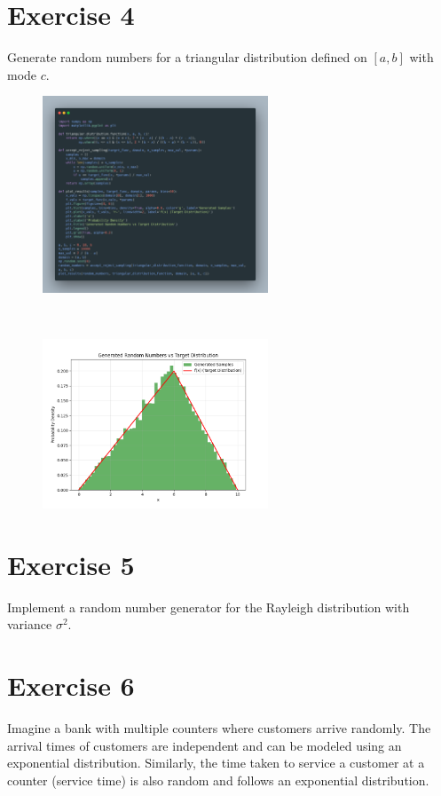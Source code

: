 \documentclass[a4paper,12pt]{article}
\begin{document}
\section{Exercise 4}
Generate random numbers for a triangular distribution defined on $[a, b]$ with mode $c$.
\begin{figure}[h!]
    \centering
    \includegraphics[width=0.6\textwidth]{./Screenshots/4.py.png} 
\end{figure} \\
\begin{figure}[h!]
    \centering
    \includegraphics[width=0.6\textwidth]{./Screenshots/4.png} 
\end{figure} 
\newpage

\section{Exercise 5}
Implement a random number generator for the Rayleigh distribution with variance $\sigma^2$.

\section{Exercise 6}
Imagine a bank with multiple counters where customers arrive randomly. The arrival times of customers are independent and can be modeled using an exponential distribution. Similarly, the time taken to service a customer at a counter (service time) is also random and follows an exponential distribution.
\end{document}
